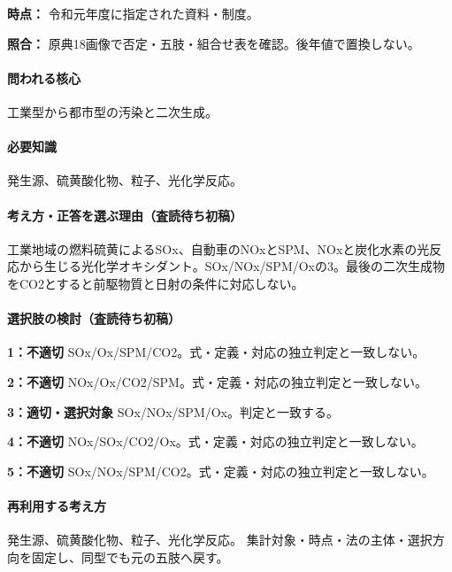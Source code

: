 \noindent\textbf{時点：} 令和元年度に指定された資料・制度。\par

\noindent\textbf{照合：} 原典18画像で否定・五肢・組合せ表を確認。後年値で置換しない。\par

\paragraph{問われる核心} 工業型から都市型の汚染と二次生成。

\paragraph{必要知識} 発生源、硫黄酸化物、粒子、光化学反応。

\paragraph{考え方・正答を選ぶ理由（査読待ち初稿）} 工業地域の燃料硫黄によるSOx、自動車のNOxとSPM、NOxと炭化水素の光反応から生じる光化学オキシダント。SOx/NOx/SPM/Oxの3。最後の二次生成物をCO2とすると前駆物質と日射の条件に対応しない。

\paragraph{選択肢の検討（査読待ち初稿）}\mbox{}\par

\noindent\textbf{1：不適切} SOx/Ox/SPM/CO2。式・定義・対応の独立判定と一致しない。\par

\noindent\textbf{2：不適切} NOx/Ox/CO2/SPM。式・定義・対応の独立判定と一致しない。\par

\noindent\textbf{3：適切・選択対象} SOx/NOx/SPM/Ox。判定と一致する。\par

\noindent\textbf{4：不適切} NOx/SOx/CO2/Ox。式・定義・対応の独立判定と一致しない。\par

\noindent\textbf{5：不適切} SOx/NOx/SPM/CO2。式・定義・対応の独立判定と一致しない。\par

\paragraph{再利用する考え方} 発生源、硫黄酸化物、粒子、光化学反応。 集計対象・時点・法の主体・選択方向を固定し、同型でも元の五肢へ戻す。

